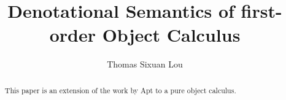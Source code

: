 \documentclass[sigplan,10pt]{acmart}\settopmatter{}
\begin{document}
\title[Short Title]{Denotational Semantics of first-order Object Calculus}         %


\author{Thomas Sixuan Lou}



\begin{abstract}
  This paper is an extension of the work by Apt \cite{Apt2000} to a pure object calculus.
\end{abstract}
\end{document}
